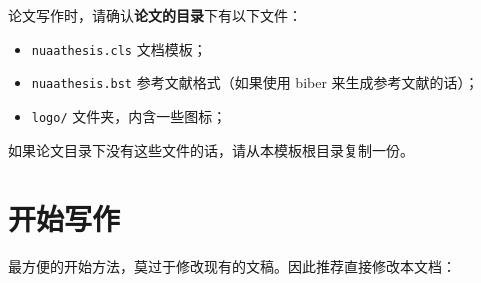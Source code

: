论文写作时，请确认\textbf{论文的目录}下有以下文件：
\begin{itemize}
  \item \verb|nuaathesis.cls| 文档模板；
  \item \verb|nuaathesis.bst| 参考文献格式（如果使用 biber 来生成参考文献的话）；
  \item \verb|logo/| 文件夹，内含一些图标；
\end{itemize}

如果论文目录下没有这些文件的话，请从本模板根目录复制一份。

\section{开始写作}

最方便的开始方法，莫过于修改现有的文稿。因此推荐直接修改本文档：
